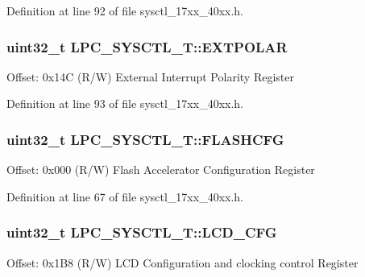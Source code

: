Definition at line 92 of file sysctl\+\_\+17xx\+\_\+40xx.\+h.

\subsubsection[{\texorpdfstring{E\+X\+T\+P\+O\+L\+AR}{EXTPOLAR}}]{ uint32\+\_\+t L\+P\+C\+\_\+\+S\+Y\+S\+C\+T\+L\+\_\+\+T\+::\+E\+X\+T\+P\+O\+L\+AR}\hypertarget{structLPC__SYSCTL__T_a7d0423c5e3f7482182c229bbc4b2b83b}{}\label{structLPC__SYSCTL__T_a7d0423c5e3f7482182c229bbc4b2b83b}
Offset\+: 0x14C (R/W) External Interrupt Polarity Register 

Definition at line 93 of file sysctl\+\_\+17xx\+\_\+40xx.\+h.

\subsubsection[{\texorpdfstring{F\+L\+A\+S\+H\+C\+FG}{FLASHCFG}}]{ uint32\+\_\+t L\+P\+C\+\_\+\+S\+Y\+S\+C\+T\+L\+\_\+\+T\+::\+F\+L\+A\+S\+H\+C\+FG}\hypertarget{structLPC__SYSCTL__T_a8dcbc2e1c89d7bd42dbd19f66e2ddd8e}{}\label{structLPC__SYSCTL__T_a8dcbc2e1c89d7bd42dbd19f66e2ddd8e}
Offset\+: 0x000 (R/W) Flash Accelerator Configuration Register 

Definition at line 67 of file sysctl\+\_\+17xx\+\_\+40xx.\+h.

\subsubsection[{\texorpdfstring{L\+C\+D\+\_\+\+C\+FG}{LCD_CFG}}]{ uint32\+\_\+t L\+P\+C\+\_\+\+S\+Y\+S\+C\+T\+L\+\_\+\+T\+::\+L\+C\+D\+\_\+\+C\+FG}\hypertarget{structLPC__SYSCTL__T_aef5d629c590fd35e8da2e061ddcdf17e}{}\label{structLPC__SYSCTL__T_aef5d629c590fd35e8da2e061ddcdf17e}
Offset\+: 0x1\+B8 (R/W) L\+CD Configuration and clocking control Register 

